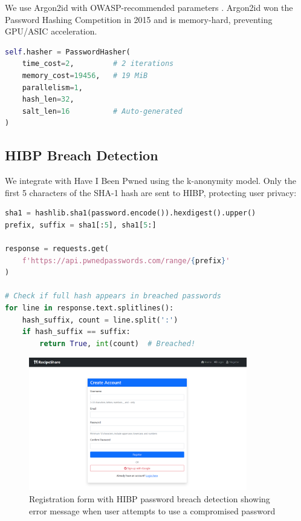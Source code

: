 \documentclass[12pt,a4paper]{article}
\begin{document}
We use Argon2id with OWASP-recommended parameters \cite{owasp_password}. Argon2id won the Password Hashing Competition in 2015 \cite{biryukov2016} and is memory-hard, preventing GPU/ASIC acceleration.

\begin{lstlisting}[language=Python]
self.hasher = PasswordHasher(
    time_cost=2,         # 2 iterations
    memory_cost=19456,   # 19 MiB
    parallelism=1,
    hash_len=32,
    salt_len=16          # Auto-generated
)
\end{lstlisting}

\subsection{HIBP Breach Detection}

We integrate with Have I Been Pwned using the k-anonymity model. Only the first 5 characters of the SHA-1 hash are sent to HIBP, protecting user privacy:

\begin{lstlisting}[language=Python]
sha1 = hashlib.sha1(password.encode()).hexdigest().upper()
prefix, suffix = sha1[:5], sha1[5:]

response = requests.get(
    f'https://api.pwnedpasswords.com/range/{prefix}'
)

# Check if full hash appears in breached passwords
for line in response.text.splitlines():
    hash_suffix, count = line.split(':')
    if hash_suffix == suffix:
        return True, int(count)  # Breached!
\end{lstlisting}

\begin{figure}[H]
    \centering
    \includegraphics[width=0.85\textwidth]{SCREENSHOTs/Register.png}
    \caption{Registration form with HIBP password breach detection showing error message when user attempts to use a compromised password}
    \label{fig:hibp}
\end{figure}
\end{document}
